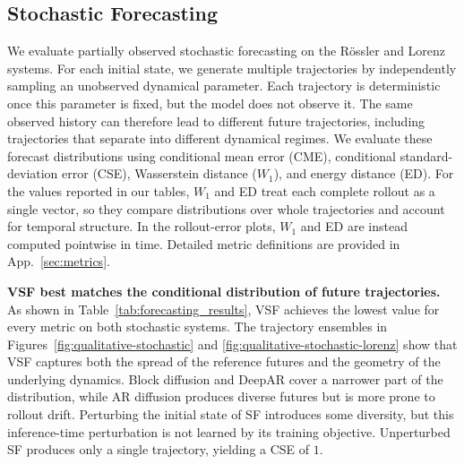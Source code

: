 \subsection{Stochastic Forecasting} \label{sec:exp-stochatic}

We evaluate partially observed stochastic forecasting on the R\"ossler and
Lorenz systems. For each initial state, we generate multiple trajectories by
independently sampling an unobserved dynamical parameter. Each trajectory is
deterministic once this parameter is fixed, but the model does not observe it.
The same observed history can therefore lead to different future trajectories,
including trajectories that separate into different dynamical regimes.
%
We evaluate these forecast distributions using conditional mean error (CME),
conditional standard-deviation error (CSE), Wasserstein distance ($W_1$), and
energy distance (ED). For the values reported in our tables, $W_1$ and ED treat
each complete rollout as a single vector, so they compare distributions over
whole trajectories and account for temporal structure. In the rollout-error
plots, $W_1$ and ED are instead computed pointwise in time. Detailed metric
definitions are provided in App.~\ref{sec:metrics}.


\textbf{VSF best matches the conditional distribution of future trajectories.}
As shown in Table~\ref{tab:forecasting_results}, VSF achieves the lowest value
for every metric on both stochastic systems. The trajectory ensembles in
Figures~\ref{fig:qualitative-stochastic} and
\ref{fig:qualitative-stochastic-lorenz} show that VSF captures both the spread
of the reference futures and the geometry of the underlying dynamics. Block
diffusion and DeepAR cover a narrower part of the distribution, while AR
diffusion produces diverse futures but is more prone to rollout drift.
Perturbing the initial state of SF introduces some diversity, but this
inference-time perturbation is not learned by its training objective.
Unperturbed SF produces only a single trajectory, yielding a CSE of $1$.


